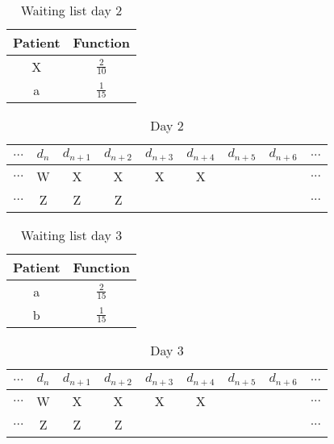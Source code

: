 \begin{table}
\centering
\begin{tabular}{|c|c|}
	\hline
	Patient & Function\\
	\hline
	X & $\frac{2}{10}$ \\
	\hline
	a & $\frac{1}{15}$\\
	\hline
\end{tabular}
\caption{Waiting list day 2}
\end{table}

\begin{table}
\centering
\begin{tabular}{|c|c|c|c|c|c|c|c|c|}
	\multicolumn{1}{c}{$...$} & \multicolumn{1}{c}{$d_n$} & \multicolumn{1}{c}{$d_{n+1}$} & \multicolumn{1}{c}{$d_{n+2}$} & \multicolumn{1}{c}{$d_{n+3}$} & \multicolumn{1}{c}{$d_{n+4}$} & \multicolumn{1}{c}{$d_{n+5}$} & \multicolumn{1}{c}{$d_{n+6}$} & \multicolumn{1}{c}{$...$}\\
	\hline
	$...$ & W & X & X & X & X &   &   & $...$\\
	\hline
	$...$ & Z & Z & Z &   &   &   &   & $...$\\
	\hline
\end{tabular}
\caption{Day 2}
\end{table}

\begin{table}
\centering
\begin{tabular}{|c|c|}
	\hline
	Patient & Function\\
	\hline
	a & $\frac{2}{15}$\\
	\hline
	b & $\frac{1}{15}$\\
	\hline
\end{tabular}
\caption{Waiting list day 3}
\end{table}

\begin{table}
\centering
\begin{tabular}{|c|c|c|c|c|c|c|c|c|}
	\multicolumn{1}{c}{$...$} & \multicolumn{1}{c}{$d_n$} & \multicolumn{1}{c}{$d_{n+1}$} & \multicolumn{1}{c}{$d_{n+2}$} & \multicolumn{1}{c}{$d_{n+3}$} & \multicolumn{1}{c}{$d_{n+4}$} & \multicolumn{1}{c}{$d_{n+5}$} & \multicolumn{1}{c}{$d_{n+6}$} & \multicolumn{1}{c}{$...$}\\
	\hline
	$...$ & W & X & X & X & X &   &   & $...$\\
	\hline
	$...$ & Z & Z & Z &   &   &   &   & $...$\\
	\hline
\end{tabular}
\caption{Day 3}
\end{table}

